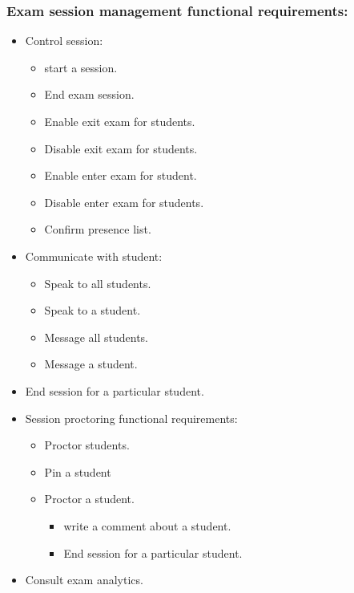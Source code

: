 \documentclass[a4paper,12p]{article}
\begin{document}
     \subsubsection{Exam session management functional requirements:}
     \begin{itemize}
         \item Control session:
         \begin{itemize}
             \item start a session.
             \item End exam session.
             \item Enable exit exam for students.
             \item Disable exit exam for students.
             \item Enable enter exam for student.
             \item Disable enter exam for students.
             \item Confirm presence list.
         \end{itemize}
         \item Communicate with student:
         \begin{itemize}
             \item Speak to all students.
             \item Speak to a student.
             \item Message all students.
             \item Message a student.
         \end{itemize}
         \item End session for a particular student.
         \item Session proctoring functional requirements:
         \begin{itemize}
             \item Proctor students.
             \item Pin a student
             \item Proctor a student.
             \begin{itemize}
                 \item write a comment about a student.
                 \item End session for a particular student.
             \end{itemize}
         \end{itemize}
        \item Consult exam analytics.
     \end{itemize}
    
\end{document}
